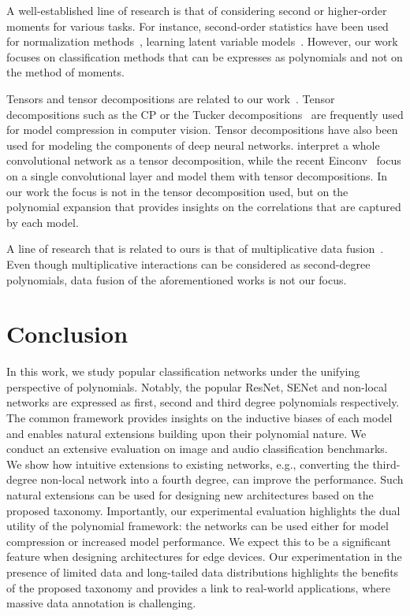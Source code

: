 \documentclass[runningheads]{llncs}
\newcommand{\resnet}{ResNet}
\newcommand{\sne}{SENet}
\providecommand{\citep}{\cite}
\providecommand{\citet}{\cite}
\begin{document}
A well-established line of research is that of considering second or higher-order moments for various tasks. For instance, second-order statistics have been used for normalization methods~\cite{huang2018decorrelated}, learning latent variable models~\cite{anandkumar2014tensor}. However, our work focuses on classification methods that can be expresses as polynomials and not on the method of moments. 

Tensors and tensor decompositions are related to our work~\citep{Sidiropoulos:16}. 
Tensor decompositions such as the CP or the Tucker decompositions~\citep{kolda2009tensor} are frequently used for model compression in computer vision. Tensor decompositions have also been used for modeling the components of deep neural networks. \citet{cohen2016convolutional} interpret a whole convolutional network as a tensor decomposition, while the recent Einconv~\citep{hayashi2019einconv} focus on a single convolutional layer and model them with tensor decompositions. In our work the focus is not in the tensor decomposition used, but on the polynomial expansion that provides insights on the correlations that are captured by each model. 


A line of research that is related to ours is that of multiplicative data fusion~\cite{jayakumar2020Multiplicative, markos, markos2, chrysos2021conditional, reed2014learning, yu2017multi, kim2018bilinear}. 
Even though multiplicative interactions can be considered as second-degree polynomials, data fusion of the aforementioned works is not our focus.

 \section{Conclusion}

In this work, we study popular classification networks under the unifying perspective of polynomials. Notably, the popular \resnet, \sne{} and non-local networks are expressed as first, second and third degree polynomials respectively. The common framework provides insights on the inductive biases of each model and enables natural extensions building upon their polynomial nature. We conduct an extensive evaluation on image and audio classification benchmarks. 
We show how intuitive extensions to existing networks, e.g., converting the third-degree non-local network into a fourth degree, can improve the performance.
Such natural extensions can be used for designing new architectures based on the proposed taxonomy.  
Importantly, our experimental evaluation highlights the dual utility of the polynomial framework: the networks can be used either for model compression or increased model performance. We expect this to be a significant feature when designing architectures for edge devices. Our experimentation in the presence of limited data and long-tailed data distributions highlights the benefits of the proposed taxonomy and provides a link to real-world applications, where massive data annotation is challenging.  
\end{document}
